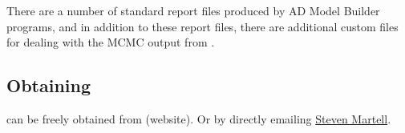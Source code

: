 \begin{multicols}{2}
 There are a number of standard report files produced by AD Model Builder programs, and in addition to these report files, there are additional custom files for dealing with the MCMC output from \iscam. 
 
 \subsection{Obtaining \iscam}
 \iscam can be freely obtained from (website).  Or by directly emailing \href{mailto:s.martell@fisheries.ubc.ca}{Steven Martell}.
 
 \end{multicols}